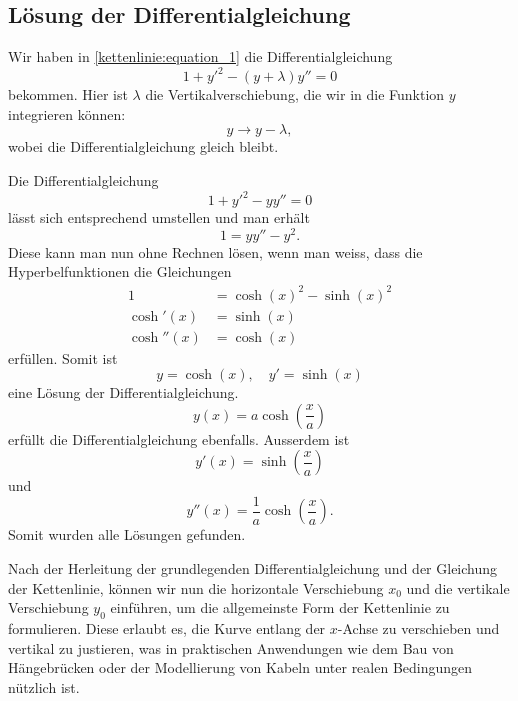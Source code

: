 \subsection{Lösung der Differentialgleichung
\label{kettenlinie:subsection:Lösung der Differentialgleichung}}
Wir haben in \eqref{kettenlinie:equation_1} die Differentialgleichung
\begin{equation}
	1 + y'^2 - (y + \lambda) y''
	=
	0
\end{equation}
bekommen.
Hier ist \(\lambda\) die Vertikalverschiebung, die wir in die Funktion \(y\) integrieren können:
\begin{equation}
	y
	\rightarrow
	y - \lambda ,
\end{equation}
wobei die Differentialgleichung gleich bleibt.

Die Differentialgleichung
\begin{equation}
	1 + y'^2 - y y''
	=
	0
\end{equation}
lässt sich entsprechend umstellen und man erhält
\begin{equation}
	1
	=
	y y'' - y^2.
\end{equation}
Diese kann man nun ohne Rechnen lösen, wenn man weiss, dass die Hyperbelfunktionen die Gleichungen
%
\begin{align*}
	1 &= \cosh(x)^2 - \sinh(x)^2 \\
	\cosh'(x) &= \sinh(x) \\
	\cosh''(x) &= \cosh(x)
\end{align*}
erfüllen. Somit ist
\begin{equation}
	y
	=
	\cosh(x), \quad
	y'
	=
	\sinh(x)
\end{equation}
eine Lösung der Differentialgleichung.
\begin{equation}
	y(x)
	=
	a \cosh\left(\frac{x}{a}\right)
\end{equation}
erfüllt die Differentialgleichung ebenfalls. Ausserdem ist 
\begin{equation}
	y'(x)
	=
	\sinh\left(\frac{x}{a}\right)
\end{equation}
und
\begin{equation}
	y''(x)
	=
	\frac{1}{a} \cosh\left(\frac{x}{a}\right).
\end{equation}
Somit wurden alle Lösungen gefunden.

Nach der Herleitung der grundlegenden Differentialgleichung und der Gleichung der Kettenlinie, können wir nun die horizontale Verschiebung \(x_0\) und die vertikale Verschiebung \(y_0\) einführen, um die allgemeinste Form der Kettenlinie zu formulieren.
Diese erlaubt es, die Kurve entlang der \(x\)-Achse zu verschieben und vertikal zu justieren, was in praktischen Anwendungen wie dem Bau von Hängebrücken oder der Modellierung von Kabeln unter realen Bedingungen nützlich ist.

